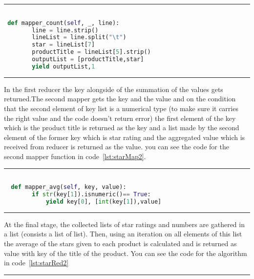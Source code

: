 \rule{200 pt}{0.5 pt} 

\renewcommand{\lstlistingname}{Code}
\lstset{style=mystyle}
\begin{lstlisting}[language=Python, caption={The average starts given to each product by the reviewers, first mapper function}, label={lst:starMap1}, mathescape = true, breaklines=true]

 def mapper_count(self, _, line):
        line = line.strip() 
        lineList = line.split("\t")
        star = lineList[7]
        productTitle = lineList[5].strip()
        outputList = [productTitle,star]
        yield outputList,1

\end{lstlisting}

\rule{200 pt}{0.5 pt}


In the first reducer the key alongside of the summation of the values gets returned.The second mapper gets the key and the value and on the condition that the second element of key list is a numerical type (to make sure it carries the right value and the code doesn't return error) the first element of the key which is the product title is returned as the key and a list made by the second element of the former key which is star rating and the aggregated value which is received from reducer is returned as the value. you can see the code for the second mapper function in code~\ref{lst:starMap2}.


\rule{200 pt}{0.5 pt} 

\renewcommand{\lstlistingname}{Code}
\lstset{style=mystyle}
\begin{lstlisting}[language=Python, caption={The average starts given to each product by the reviewers, second mapper}, label={lst:starMap2}, mathescape = true, breaklines=true]

  def mapper_avg(self, key, value):
        if str(key[1]).isnumeric()== True:
            yield key[0], [int(key[1]),value]

\end{lstlisting}

\rule{200 pt}{0.5 pt}


At the final stage, the collected lists of star ratings and numbers are gathered in a list (consists a list of list). Then, using an iteration on all elements of this list the average of the stars given to each product is calculated and is returned as value with key of the title of the product. You can see the code for the algorithm in code~\ref{lst:starRed2}

\rule{200 pt}{0.5 pt} 

